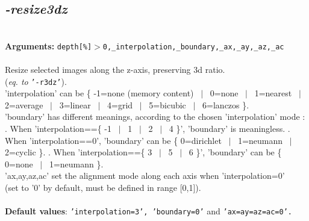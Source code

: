 \documentclass[a4paper,11pt,twoside]{book}
\begin{document}
\subsection{\emph{-resize3dz} }\vspace*{-0.5em}
~\\\textbf{Arguments: } 
{\small \texttt{depth[\%]$>$0,\_interpolation,\_boundary,\_ax,\_ay,\_az,\_ac}}\\~\\
Resize selected images along the z-axis, preserving 3d ratio.
~\\(\emph{eq. to} {\small \texttt{'-r3dz'}}).
~\\'interpolation' can be \{ -1=none (memory content) ~$|$~ 0=none ~$|$~ 1=nearest ~$|$~ 2=average ~$|$~ 3=linear ~$|$~ 4=grid ~$|$~ 5=bicubic ~$|$~ 6=lanczos \}.
~\\'boundary' has different meanings, according to the chosen 'interpolation' mode :
. When 'interpolation==\{ -1 ~$|$~ 1 ~$|$~ 2 ~$|$~ 4 \}', 'boundary' is meaningless.
. When 'interpolation==0', 'boundary' can be \{ 0=dirichlet ~$|$~ 1=neumann ~$|$~ 2=cyclic \}.
. When 'interpolation==\{ 3 ~$|$~ 5 ~$|$~ 6 \}', 'boundary' can be \{ 0=none ~$|$~ 1=neumann \}.
~\\'ax,ay,az,ac' set the alignment mode along each axis when 'interpolation=0'
~\\(set to '0' by default, must be defined in range [0,1]).
~\\~\\\textbf{Default values}: {\small \texttt{'interpolation=3', 'boundary=0'} and \texttt{'ax=ay=az=ac=0'.}}
\end{document}
